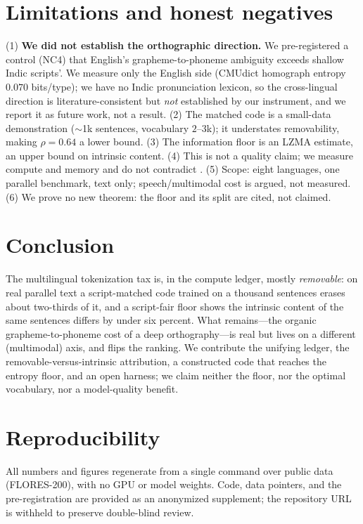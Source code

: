 \documentclass[11pt]{article}
\begin{document}
\section{Limitations and honest negatives}\label{sec:limits}
(1) \textbf{We did not establish the orthographic direction.} We pre-registered a control (NC4) that
English's grapheme-to-phoneme ambiguity exceeds shallow Indic scripts'. We measure only the English side
(CMUdict homograph entropy $0.070$ bits/type); we have no Indic pronunciation lexicon, so the
cross-lingual direction is literature-consistent but \emph{not} established by our instrument, and we
report it as future work, not a result. (2) The matched code is a small-data demonstration
($\sim$1k sentences, vocabulary $2$--$3$k); it understates removability, making $\rho=0.64$ a lower
bound. (3) The information floor is an LZMA estimate, an upper bound on intrinsic content. (4) This is not
a quality claim; we measure compute and memory and do not contradict \citet{schmidt2024morethan}. (5)
Scope: eight languages, one parallel benchmark, text only; speech/multimodal cost is argued, not
measured. (6) We prove no new theorem: the floor and its split are cited, not claimed.

\section{Conclusion}
The multilingual tokenization tax is, in the compute ledger, mostly \emph{removable}: on real parallel
text a script-matched code trained on a thousand sentences erases about two-thirds of it, and a
script-fair floor shows the intrinsic content of the same sentences differs by under six percent. What
remains---the organic grapheme-to-phoneme cost of a deep orthography---is real but lives on a different
(multimodal) axis, and flips the ranking. We contribute the unifying ledger, the
removable-versus-intrinsic attribution, a constructed code that reaches the entropy floor, and an open
harness; we claim neither the floor, nor the optimal vocabulary, nor a model-quality benefit.

\section*{Reproducibility}
All numbers and figures regenerate from a single command over public data (FLORES-200), with no GPU or
model weights. Code, data pointers, and the pre-registration are provided as an anonymized supplement;
the repository URL is withheld to preserve double-blind review.


\end{document}
